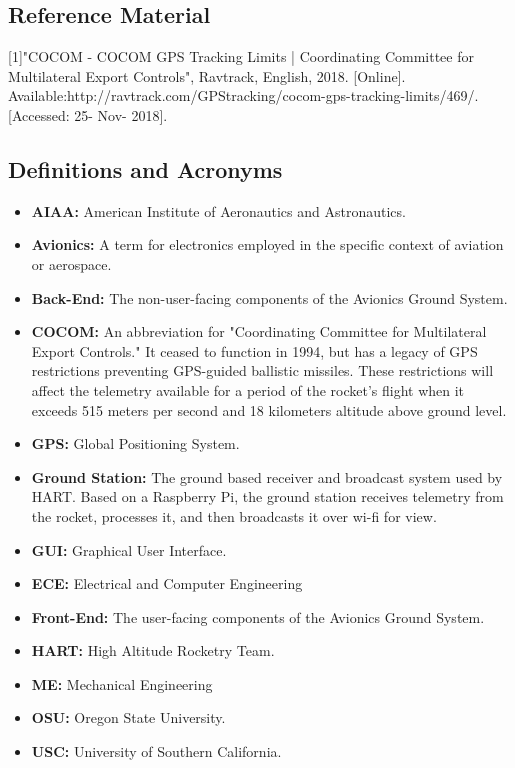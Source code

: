 \documentclass[journal,10pt,onecolumn,compsoc]{IEEEtran}
\begin{document}
	\subsection{Reference Material}
		[1]"COCOM - COCOM GPS Tracking Limits | Coordinating Committee for Multilateral Export Controls", Ravtrack, English, 2018. [Online]. Available:http://ravtrack.com/GPStracking/cocom-gps-tracking-limits/469/. [Accessed: 25- Nov- 2018].

	\subsection{Definitions and Acronyms}
	\begin{itemize}
		\item \textbf{AIAA:}
			American Institute of Aeronautics and Astronautics.
		
		\item \textbf{Avionics:}
			A term for electronics employed in the specific context of aviation or aerospace.
		
		\item \textbf{Back-End:}
			The non-user-facing components of the Avionics Ground System.
		
		\item \textbf{COCOM:}
			An abbreviation for "Coordinating Committee for Multilateral Export Controls."
			It ceased to function in 1994, but has a legacy of GPS restrictions preventing GPS-guided ballistic missiles.
			These restrictions will affect the telemetry available for a period of the rocket's flight when it exceeds 515 meters per second and 18 kilometers altitude above ground level.
		
		\item \textbf{GPS:}
			Global Positioning System.
		
		\item \textbf{Ground Station:}
			The ground based receiver and broadcast system used by HART. 
			Based on a Raspberry Pi, the ground station receives telemetry from the rocket, processes it, and then broadcasts it over wi-fi for view.
		
		\item \textbf{GUI:}
			Graphical User Interface.
		
		\item \textbf{ECE:}
			Electrical and Computer Engineering
		
		\item \textbf{Front-End:}
			The user-facing components of the Avionics Ground System.
		
		\item \textbf{HART:}
			High Altitude Rocketry Team.
		
		\item \textbf{ME:}
			Mechanical Engineering	
		
		\item \textbf{OSU:}
			Oregon State University.
		
		\item \textbf{USC:}
			University of Southern California.
	
	\end{itemize}
\end{document}
